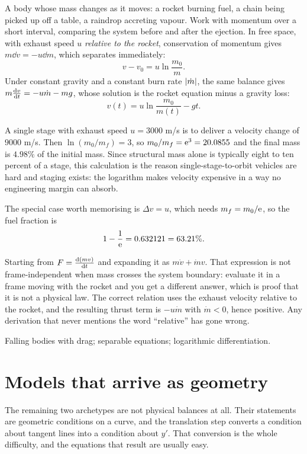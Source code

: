 \cue A body whose mass changes as it moves: a rocket burning fuel, a chain being picked up off a table, a raindrop accreting vapour.
\method Work with momentum over a short interval, comparing the system before and after the ejection. In free space, with exhaust speed $u$ \emph{relative to the rocket}, conservation of momentum gives $m\dd v=-u\dd m$, which separates immediately:
\[v-v_0=u\ln\frac{m_0}{m}.\]
Under constant gravity and a constant burn rate $\left\lvert \dot m\right\rvert$, the same balance gives $m\frac{\mathrm{d}v}{\mathrm{d}t}=-u\dot m-mg$, whose solution is the rocket equation minus a gravity loss:
\[v(t)=u\ln\frac{m_0}{m(t)}-gt.\]

\begin{worked}
A single stage with exhaust speed $u=3000$ m/s is to deliver a velocity change of $9000$ m/s. Then $\ln(m_0/m_f)=3$, so $m_0/m_f=\mathrm{e}^{3}=20.0855$ and the final mass is $4.98\%$ of the initial mass. Since structural mass alone is typically eight to ten percent of a stage, this calculation is the reason single-stage-to-orbit vehicles are hard and staging exists: the logarithm makes velocity expensive in a way no engineering margin can absorb.

The special case worth memorising is $\Delta v=u$, which needs $m_f=m_0/\mathrm{e}$, so the fuel fraction is
\[1-\frac1{\mathrm{e}}=0.632121=63.21\%.\]
\end{worked}

\begin{trap}
Starting from $F=\frac{\mathrm{d}(mv)}{\mathrm{d}t}$ and expanding it as $m\dot v+\dot mv$. That expression is not frame-independent when mass crosses the system boundary: evaluate it in a frame moving with the rocket and you get a different answer, which is proof that it is not a physical law. The correct relation uses the exhaust velocity relative to the rocket, and the resulting thrust term is $-u\dot m$ with $\dot m<0$, hence positive. Any derivation that never mentions the word ``relative'' has gone wrong.
\end{trap}

\begin{seealsob}Falling bodies with drag; separable equations; logarithmic differentiation.\end{seealsob}

\section{Models that arrive as geometry}

The remaining two archetypes are not physical balances at all. Their statements are geometric conditions on a curve, and the translation step converts a condition about tangent lines into a condition about $y'$. That conversion is the whole difficulty, and the equations that result are usually easy.

